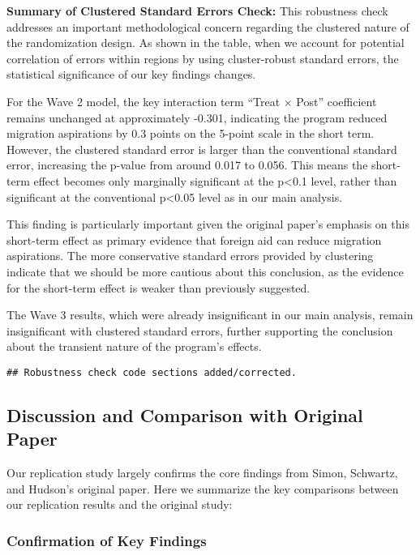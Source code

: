 \documentclass[
]{article}
\begin{document}
\textbf{Summary of Clustered Standard Errors Check:} This robustness
check addresses an important methodological concern regarding the
clustered nature of the randomization design. As shown in the table,
when we account for potential correlation of errors within regions by
using cluster-robust standard errors, the statistical significance of
our key findings changes.

For the Wave 2 model, the key interaction term ``Treat × Post''
coefficient remains unchanged at approximately -0.301, indicating the
program reduced migration aspirations by 0.3 points on the 5-point scale
in the short term. However, the clustered standard error is larger than
the conventional standard error, increasing the p-value from around
0.017 to 0.056. This means the short-term effect becomes only marginally
significant at the p\textless0.1 level, rather than significant at the
conventional p\textless0.05 level as in our main analysis.

This finding is particularly important given the original paper's
emphasis on this short-term effect as primary evidence that foreign aid
can reduce migration aspirations. The more conservative standard errors
provided by clustering indicate that we should be more cautious about
this conclusion, as the evidence for the short-term effect is weaker
than previously suggested.

The Wave 3 results, which were already insignificant in our main
analysis, remain insignificant with clustered standard errors, further
supporting the conclusion about the transient nature of the program's
effects.

\begin{verbatim}
## Robustness check code sections added/corrected.
\end{verbatim}

\subsection{Discussion and Comparison with Original
Paper}\label{discussion-and-comparison-with-original-paper}

Our replication study largely confirms the core findings from Simon,
Schwartz, and Hudson's original paper. Here we summarize the key
comparisons between our replication results and the original study:

\subsubsection{Confirmation of Key
Findings}\label{confirmation-of-key-findings}
\end{document}
